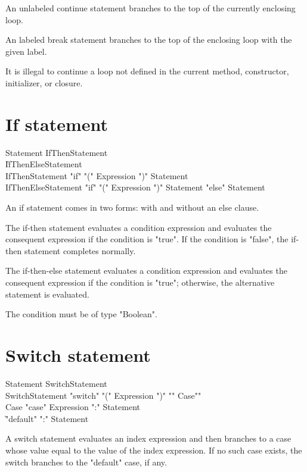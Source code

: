 An unlabeled continue statement branches to the top of the
currently enclosing loop.

An labeled break statement branches to the top of the enclosing loop
with the given label.

It is illegal to continue a loop not defined in the current
method, constructor, initializer, or closure.

\section{If statement}

\begin{grammar}
Statement \: IfThenStatement \\
          \| IfThenElseStatement \\
IfThenStatement \: \xcd"if" \xcd"(" Expression \xcd")" Statement \\
IfThenElseStatement \: \xcd"if" \xcd"(" Expression \xcd")" Statement \xcd"else" Statement \\
\end{grammar}

An if statement comes in two forms: with and without an else
clause.

The if-then statement evaluates a condition expression and 
evaluates the consequent expression if the condition is
\xcd"true".  If the 
condition is \xcd"false",
the if-then statement completes normally.

The if-then-else statement evaluates a condition expression and 
evaluates the consequent expression if the condition is
\xcd"true"; otherwise, the alternative statement is evaluated.

The condition must be of type \xcd"Boolean".

\section{Switch statement}

\begin{grammar}
Statement \: SwitchStatement \\
SwitchStatement \: \xcd"switch" \xcd"(" Expression \xcd")" \xcd"{" Case\plus \xcd"}" \\
Case \: \xcd"case" Expression \xcd":" Statement\star \\
     \| \xcd"default" \xcd":" Statement\star \\
\end{grammar}

A switch statement evaluates an index expression and then branches to
a case whose value equal to the value of the index expression.
If no such case exists, the switch branches to the 
\xcd"default" case, if any.

